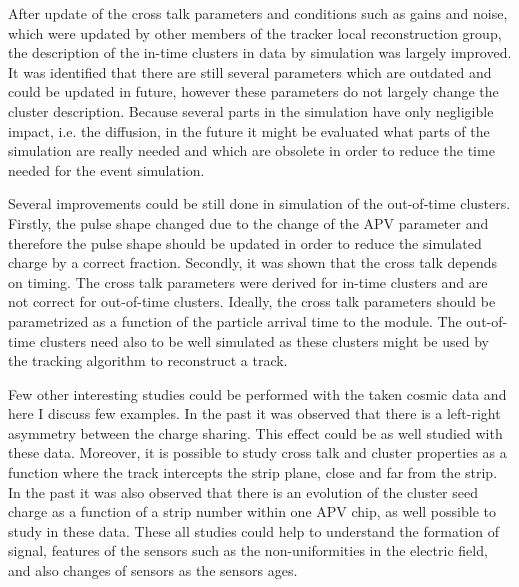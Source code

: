 After update of the cross talk parameters and conditions such as gains and noise, which were updated by other members of the tracker local reconstruction group, the description of the in-time clusters in data by simulation was largely improved. It was identified that there are still several parameters which are outdated and could be  updated in future, however these parameters do not largely change the cluster description. Because several parts in the simulation have only negligible impact, i.e. the diffusion, in the future it might be evaluated what parts of the simulation are really needed and which are obsolete in order to reduce the time needed for the event simulation.

Several improvements could be still done in simulation of the out-of-time clusters. Firstly, the pulse shape changed due to the change of the APV parameter and therefore the pulse shape should be updated in order to reduce the simulated charge by a correct fraction. Secondly, it was shown that the cross talk depends on timing. The cross talk parameters were derived for in-time clusters and are not correct for out-of-time clusters. Ideally, the cross talk parameters should be parametrized as a function of the particle arrival time to the module. The out-of-time clusters need also to be well simulated as these clusters might be used by the tracking algorithm to reconstruct a track.

Few other interesting studies could be performed with the taken cosmic data and here I discuss few examples. In the past it was observed that there is a left-right asymmetry between the charge sharing. This effect could be as well studied with these data. Moreover, it is possible to study cross talk and cluster properties as a function where the track intercepts the strip plane, close and far from the strip. In the past it was also observed that there is an evolution of the cluster seed charge as a function of a strip number within one APV chip, as well possible to study in these data. These all studies could help to understand the formation of signal, features of the sensors such as the non-uniformities in the electric field, and also changes of sensors as the sensors ages. 



 
